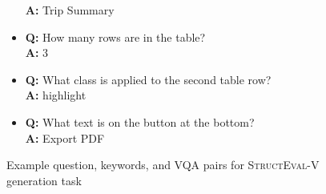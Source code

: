 \begin{figure}[!b]
\begin{tcolorbox}
\begin{itemize}[nosep,leftmargin=*]
            \textbf{A:} Trip Summary
      \item \textbf{Q:} How many rows are in the table?\\
            \textbf{A:} 3
      \item \textbf{Q:} What class is applied to the second table row?\\
            \textbf{A:} highlight
      \item \textbf{Q:} What text is on the button at the bottom?\\
            \textbf{A:} Export PDF
    \end{itemize}
    \end{tcolorbox}
    \caption{Example question, keywords, and VQA pairs for \textsc{StructEval-V} generation task}
    \label{fig:sev_gen_example}
\end{figure}